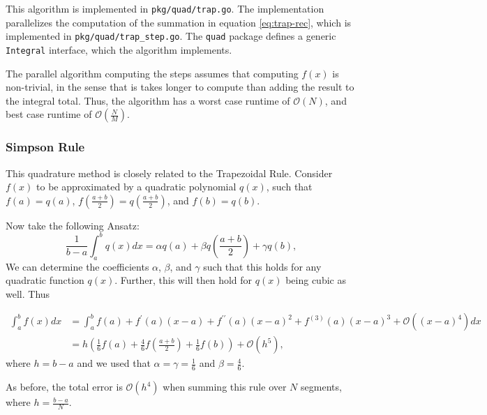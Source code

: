 \documentclass[10pt, a4paper]{article}
\begin{document}
  This algorithm is implemented in \texttt{pkg/quad/trap.go}. The implementation parallelizes the computation
  of the summation in equation \ref{eq:trap-rec}, which is implemented in \texttt{pkg/quad/trap\_step.go}.
  The \texttt{quad} package defines a generic \texttt{Integral} interface, which the algorithm implements.

  The parallel algorithm computing the steps assumes that computing $f(x)$ is non-trivial, in the sense
  that is takes longer to compute than adding the result to the integral total. Thus, the
  algorithm has a worst case runtime of $\mathcal{O}(N)$, and best case runtime of $\mathcal{O}(\frac NM)$.

  \subsubsection{Simpson Rule}
  This quadrature method is closely related to the Trapezoidal Rule\footnotemark. Consider
  $f(x)$ to be approximated by a quadratic polynomial $q(x)$, such that $f(a) = q(a)$,
  $f(\frac{a+b}{2}) = q(\frac{a+b}{2})$, and $f(b) = q(b)$.


  Now take the following Ansatz:
  \begin{equation}
  \frac{1}{b-a} \int_a^b q(x) dx = \alpha q(a) + \beta q(\frac{a+b}{2}) + \gamma q(b),
  \end{equation}
  We can determine the coefficients $\alpha$, $\beta$, and $\gamma$ such that this holds for any
  quadratic function $q(x)$. Further, this will then hold for $q(x)$ being cubic as well. Thus

  \begin{equation}
  \begin{split}
  \int_a^b f(x) dx &= \int_a^b f(a) + f^\prime(a) (x-a) + f^{\prime\prime}(a) (x-a)^2 + f^{(3)}(a) (x-a)^3 + \mathcal{O}\left((x-a)^4\right) dx \\
  &= h \left( \frac{1}{6} f(a) + \frac{4}{6} f(\frac{a+b}{2}) + \frac{1}{6} f(b) \right) + \mathcal{O}(h^5),
  \end{split}
  \end{equation}
  where $h = b-a$ and we used that $\alpha = \gamma = \frac{1}{6}$ and $\beta = \frac{4}{6}$.

  As before, the total error is $\mathcal{O}(h^4)$ when summing this rule over $N$ segments, where
  $h = \frac{b-a}{N}$.
\end{document}
